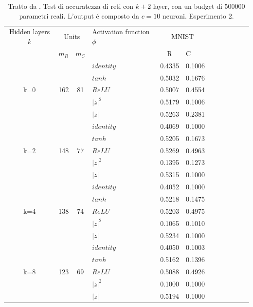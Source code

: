 \documentclass[a4paper,12pt]{report}
\begin{document}
 \newpage
  
 \begin{table}[h]
  \centering
  \begin{tabular}{cp{} cp{} cp{}   cp{} cp{} cp{}}
   \cline{1-6}
   Hidden layers $k$ & \multicolumn{2}{c}{Units} $p_R$ & Activation function $\phi$ & \multicolumn{2}{c}{MNIST}\\
   \cline{2-3} \cline{5-6}
   & $m_R$ & $m_C$ & & R & C \\
   \cline{1-6}
   & & & $identity$ & 0.4335 & 0.1006 \\
   \cline{4-6}
   & & & $tanh$ & 0.5032 & 0.1676 \\
   \cline{4-6}
   k=0 & 162 & 81 & $ReLU$ & 0.5007 & 0.4554 \\
   \cline{4-6}
   & & & $|z|^2$ & 0.5179 & 0.1006 \\
   \cline{4-6}
   & & & $|z|$ & 0.5263 & 0.2381 \\
   \cline{1-6}
   
   \cline{1-6}
   & & & $identity$ & 0.4069 & 0.1000 \\
   \cline{4-6}
   & & & $tanh$ & 0.5205 & 0.1673 \\
   \cline{4-6}
   k=2 & 148 & 77 & $ReLU$ & 0.5269 & 0.4963 \\
   \cline{4-6}
   & & & $|z|^2$ & 0.1395 & 0.1273 \\
   \cline{4-6}
   & & & $|z|$ & 0.5315 & 0.1000 \\
   \cline{1-6}
   
   \cline{1-6}
   & & & $identity$ & 0.4052 & 0.1000 \\
   \cline{4-6}
   & & & $tanh$ & 0.5218 & 0.1475 \\
   \cline{4-6}
   k=4 & 138 & 74 & $ReLU$ & 0.5203 & 0.4975 \\
   \cline{4-6}
   & & & $|z|^2$ & 0.1065 & 0.1010 \\
   \cline{4-6}
   & & & $|z|$ & 0.5234 & 0.1000 \\
   \cline{1-6}
   
   \cline{1-6}
   & & & $identity$ & 0.4050 & 0.1003 \\
   \cline{4-6}
   & & & $tanh$ & 0.5162 & 0.1396 \\
   \cline{4-6}
   k=8 & 123 & 69 & $ReLU$ & 0.5088 & 0.4926 \\
   \cline{4-6}
   & & & $|z|^2$ & 0.1000 & 0.1000 \\
   \cline{4-6}
   & & & $|z|$ & 0.5194 & 0.1000 \\
   \cline{1-6}
      
  \end{tabular}
  \caption{Tratto da \cite{monning2018evaluation}. Test di accuratezza di reti con $k+2$ layer, con un budget di 500000 parametri reali. L'output \'e composto da $c=10$ neuroni. Esperimento 2.}
  \label{MNIST2Tab}
 \end{table}
  
\end{document}
